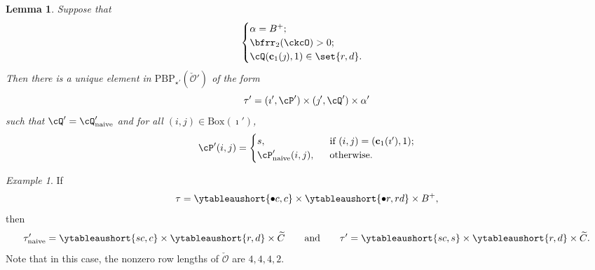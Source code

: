 \documentclass[12pt,a4paper]{amsart}
\newcommand{\CO}{{\mathcal {O}}}
\numberwithin{equation}{section}
\newtheorem{lem}[thm]{Lemma}
\theoremstyle{remark}
\newtheorem*{Example}{Example}
\let\ytb=\ytableaushort
\def\BOX{\mathrm{Box}}
\begin{document}
\begin{lem}\label{descb2}
  Suppose that
\[  \begin{cases}
 \alpha = B^+; & \\
 \bfrr_2(\ckcO)>0; & \\
 \cQ(\mathbf c_1(\jmath),1)\in \set{r,d}.
\end{cases}
\]
 Then there is a unique element in $\mathrm{PBP}_{\star'}(\check \CO')$ of the form
  \[
      \tau'=(\imath', \cP')\times (\jmath', \cQ')\times \alpha'
  \]
 such that
     $
     \cQ' = \cQ'_{\mathrm{naive}}
     $
     and
     for all $(i,j)\in \BOX(\imath')$,
\[
\cP'(i,j) = \begin{cases}
  s, & \ \text{ if $(i,j) = (\mathbf c_1(\imath'),1)$;}\\
  \cP'_{\mathrm{naive}}(i,j), & \ \text{ otherwise}.
\end{cases}
\]
\end{lem}

\begin{Example}
 If
 \[
 \tau= \ytb{\bullet c, c} \times \ytb{\bullet r, rd}\times
  B^+,
 \]
 then
\[
 \tau'_{\mathrm{naive}}= \ytb{s c, c} \times \ytb{r, d}\times
  \widetilde C\qquad\textrm{and}\qquad \tau'= \ytb{s c, s} \times \ytb{r, d}\times
  \widetilde C.
 \]
 Note that in this case, the nonzero row lengths of $\check \CO$ are $4,4,4,2$.
\end{Example}
\end{document}
